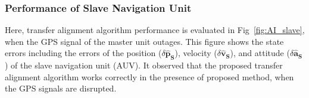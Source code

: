 \documentclass[3p]{elsarticle}
\begin{document}
\subsubsection{Performance of Slave Navigation Unit}
\noindent Here, transfer alignment algorithm performance is evaluated in Fig~\ref{fig:AI_slave}, when the GPS signal of the master unit outages.
This figure shows the state errors including the errors of the position (\(\delta \hat{\mathbf{p}}_{\mathbf{S}}\)), velocity (\(\delta \hat{\mathbf{v}}_{\mathbf{S}}\)), and attitude (\(\delta \hat{\mathbf{a}}_{\mathbf{S}}\)) of the slave navigation unit (AUV). It observed that the proposed transfer alignment algorithm  works correctly in the presence of proposed method, when the GPS signals are disrupted.

\begin{figure}[H]
	\centering
	\\
\end{figure}
\end{document}
